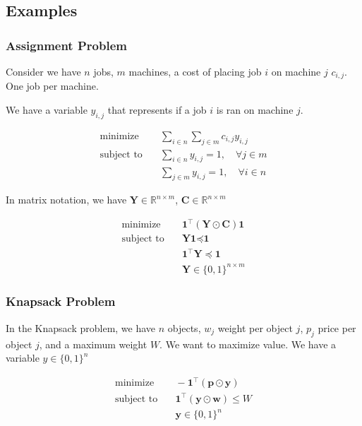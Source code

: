 \subsection{Examples}

\subsubsection{Assignment Problem}
Consider we have $n$ jobs, $m$ machines, a cost of placing job $i$ on machine $j$ $c_{i,j}$.
One job per machine.

We have a variable $y_{i,j}$ that represents if a job $i$ is ran on machine $j$.

\begin{align}
  \text{minimize} & \quad \sum_{i \in n} \sum_{j \in m} c_{i,j} y_{i,j} \\
  \text{subject to} & \quad \sum_{i \in n}y_{i,j} = 1, \quad \forall j \in m \\
  & \quad \sum_{j \in m} y_{i,j} = 1, \quad \forall i \in n
\end{align}

In matrix notation, we have $\textbf{Y} \in \mathbb{R}^{n \times m}$, $\textbf{C} \in \mathbb{R}^{n \times m}$

\begin{align}
  \text{minimize} & \quad \textbf{1}^\top(\textbf{Y} \odot \textbf{C}) \textbf{1} \\
  \text{subject to} & \quad \textbf{Y} \textbf{1} \preceq \textbf{1} \\
  & \quad \textbf{1}^\top \textbf{Y} \preceq \textbf{1} \\
  & \quad \textbf{Y} \in \{ 0, 1 \}^{n \times m}
\end{align}

\subsubsection{Knapsack Problem}
In the Knapsack problem, we have $n$ objects, $w_j$ weight per object $j$, $p_j$ price per object $j$, and a maximum weight $W$. 
We want to maximize value.
We have a variable $y \in \{ 0,1 \}^n$

\begin{align}
  \text{minimize} & \quad - \textbf{1}^\top (\textbf{p} \odot \textbf{y}) \\
  \text{subject to} & \quad  \textbf{1}^\top(\textbf{y} \odot \textbf{w}) \leq W \\
  & \quad \textbf{y} \in \{ 0,1 \}^n
\end{align}